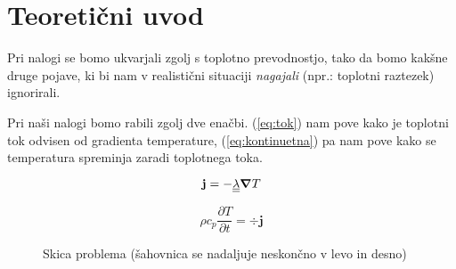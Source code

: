 \documentclass[12pt]{article}
\begin{document}
\newpage
\section{Teoretični uvod}

Pri nalogi se bomo ukvarjali zgolj s toplotno prevodnostjo, tako da bomo kakšne druge pojave, ki bi nam v realistični situaciji \textit{nagajali} (npr.: toplotni raztezek) ignorirali.

Pri naši nalogi bomo rabili zgolj dve enačbi. (\ref{eq:tok}) nam pove kako je toplotni tok odvisen od gradienta temperature, (\ref{eq:kontinuetna}) pa nam pove kako se temperatura spreminja zaradi toplotnega toka.

\begin{equation}
  \mathbf{j} = - \underline{\underline{\lambda}} \grad{T}
  \label{eq:tok}
\end{equation}

\begin{equation}
  \rho c_p \frac{\partial T}{\partial t} = \div \mathbf{j}
  \label{eq:kontinuetna}
\end{equation}





\newpage
\begin{figure}[h]
  \centering
  \caption{Skica problema (šahovnica se nadaljuje neskončno v levo in desno)}
  \label{fig:wide_chessboard}
\end{figure}
\end{document}

